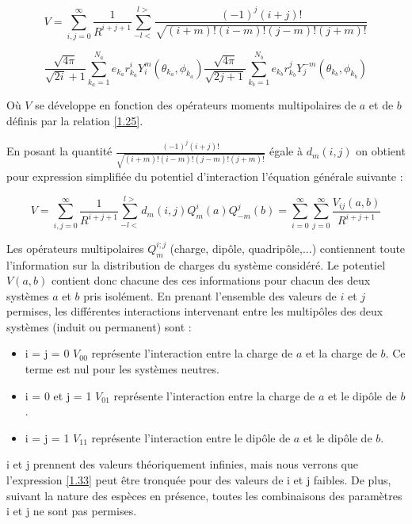 \begin{equation}
V = \sum_{i,j=0}^{\infty} \frac{1}{R^{i+j+1}} \sum_{-l<}^{l>} \frac{(-1)^{j} (i+j)!} {\sqrt{(i+m)! (i-m)! (j-m)! (j+m)!}}
\end{equation}
	
\begin{equation}
\frac{\sqrt{4\pi}}{\sqrt{2i}+ 1} \sum_{k_{a}=1}^{N_{a}} e_{k_{a}} r_{k_{a}}^{i} Y_{i}^{m} (\theta_{k_{a}},\phi_{k_{a}}) \frac{\sqrt{4\pi}}{\sqrt{2j+ 1}} \sum_{k_{b}=1}^{N_{b}} e_{k_{b}}r_{k_{b}}^{j} Y_{j}^{-m}(\theta_{k_{b}},\phi_{k_{b}})
\end{equation}
	
Où $V$ se développe en fonction des opérateurs moments multipolaires de $a$ et de $b$ définis par la relation \ref{1.25}.
	
En posant la quantité $\frac{(-1)^{j} (i+j)!} {\sqrt{(i+m)! (i-m)! (j-m)! (j+m)!}}$ égale à $d_{m}(i,j)$ on obtient pour expression simplifiée du potentiel d'interaction l'équation générale suivante : 
	
\begin{equation}
V = \sum_{i,j=0}^{\infty} \frac{1}{R^{i+j+1}} \sum_{-l<}^{l>} d_{m}(i,j) Q_{m}^{i}(a) Q_{-m}^{j} (b) = \sum_{i=0}^{\infty} \sum_{j=0}^{\infty} \frac{V_{ij}(a,b)}{R^{i+j+1}} \label{1.33}
\end{equation}
	
Les opérateurs multipolaires $Q_{m}^{i;j}$ (charge, dipôle, quadripôle,...) contiennent toute l'information sur la distribution de charges du système considéré. Le potentiel $V(a,b)$ contient donc chacune des ces informations pour chacun des deux systèmes $a$ et $b$ pris isolément. En prenant l'ensemble des valeurs de $i$ et $j$ permises, les différentes interactions intervenant entre les multipôles des deux systèmes (induit ou permanent) sont :
	
\begin{itemize}
	\item i = j = 0 $V_{00}$ représente l'interaction entre la charge de $a$ et la charge de $b$. Ce terme est nul pour les systèmes neutres. 	
	\item i = 0 et j = 1 $V_{01}$ représente l'interaction entre la charge de $a$ et le dipôle de $b$. 	
	\item i = j = 1  $V_{11}$ représente l'interaction entre le dipôle de $a$ et le dipôle de $b$.
\end{itemize}
	
i et j prennent des valeurs théoriquement infinies, mais nous verrons que l'expression \ref{1.33} peut être tronquée pour des valeurs de i et j faibles. De plus, suivant la nature des espèces en présence, toutes les combinaisons des paramètres i et j ne sont pas permises.



